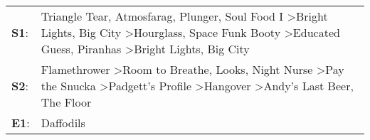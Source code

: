 \begin{supertabular}{p{0.03\textwidth}p{0.92\textwidth}}
 \textbf{S1}:  &  Triangle Tear\textsuperscript{}, \enspace Atmosfarag\textsuperscript{}, \enspace Plunger\textsuperscript{}, \enspace Soul Food I\textsuperscript{} \textgreater \enspace Bright Lights, Big City\textsuperscript{} \textgreater \enspace Hourglass\textsuperscript{}, \enspace Space Funk Booty\textsuperscript{} \textgreater \enspace Educated Guess\textsuperscript{}, \enspace Piranhas\textsuperscript{} \textgreater \enspace Bright Lights, Big City\textsuperscript{}  \enspace  \\
 \textbf{S2}:  &                                              Flamethrower\textsuperscript{} \textgreater \enspace Room to Breathe\textsuperscript{}, \enspace Looks\textsuperscript{}, \enspace Night Nurse\textsuperscript{} \textgreater \enspace Pay the Snucka\textsuperscript{} \textgreater \enspace Padgett's Profile\textsuperscript{} \textgreater \enspace Hangover\textsuperscript{} \textgreater \enspace Andy's Last Beer\textsuperscript{}, \enspace The Floor\textsuperscript{}  \enspace  \\
 \textbf{E1}:  &                                                                                                                                                                                                                                                                                                                                                                                                                                                    Daffodils\textsuperscript{}  \enspace  \\
\end{supertabular}
